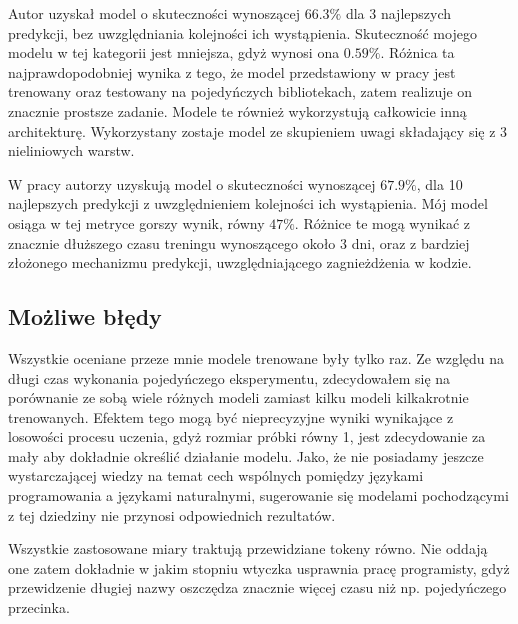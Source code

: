 Autor \cite{contextual_code_completion} uzyskał model o skuteczności wynoszącej \begin{math}66.3\%\end{math} dla 3 najlepszych predykcji, bez uwzględniania 
kolejności ich wystąpienia. Skuteczność mojego modelu w tej kategorii jest mniejsza, gdyż wynosi ona \begin{math}0.59\%\end{math}. Różnica 
ta najprawdopodobniej wynika z tego, że model przedstawiony w pracy \cite{contextual_code_completion} jest trenowany oraz testowany na pojedyńczych bibliotekach, 
zatem realizuje on znacznie prostsze zadanie. Modele te również wykorzystują całkowicie inną architekturę. Wykorzystany zostaje model ze skupieniem uwagi składający 
się z 3 nieliniowych warstw. 

W pracy autorzy \cite{hellendoorn} uzyskują model o skuteczności wynoszącej \begin{math}67.9\%\end{math}, dla 10 najlepszych predykcji z uwzględnieniem 
kolejności ich wystąpienia. Mój model osiąga w tej metryce gorszy wynik, równy \begin{math}47\%\end{math}. Różnice te mogą wynikać z znacznie 
dłuższego czasu treningu wynoszącego około 3 dni, oraz z bardziej złożonego mechanizmu predykcji, uwzględniającego zagnieżdżenia w kodzie. 

\subsection{Możliwe błędy}
Wszystkie oceniane przeze mnie modele trenowane były tylko raz. Ze względu na długi czas wykonania pojedyńczego eksperymentu, zdecydowałem 
się na porównanie ze sobą wiele różnych modeli zamiast kilku modeli kilkakrotnie trenowanych. Efektem tego mogą być nieprecyzyjne wyniki 
wynikające z losowości procesu uczenia, gdyż rozmiar próbki równy 1, jest zdecydowanie za mały aby dokładnie określić działanie modelu. 
Jako, że nie posiadamy jeszcze wystarczającej wiedzy na temat cech wspólnych pomiędzy językami programowania a językami naturalnymi, 
sugerowanie się modelami pochodzącymi z tej dziedziny nie przynosi odpowiednich rezultatów. 

Wszystkie zastosowane miary traktują przewidziane tokeny równo. Nie oddają one zatem dokładnie w jakim stopniu wtyczka usprawnia pracę 
programisty, gdyż przewidzenie długiej nazwy oszczędza znacznie więcej czasu niż np. pojedyńczego przecinka. 

